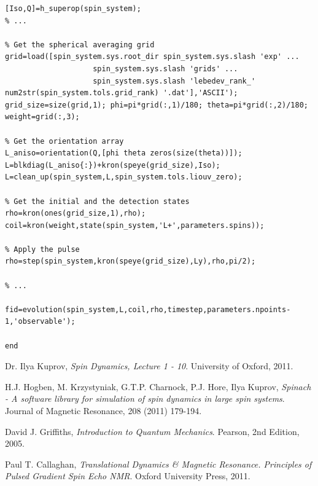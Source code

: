 \documentclass[11.5pt,a4paper]{article}
\begin{document}
\begin{lstlisting}[firstnumber=last]
% ...
[Iso,Q]=h_superop(spin_system);
% ...

% Get the spherical averaging grid
grid=load([spin_system.sys.root_dir spin_system.sys.slash 'exp' ...
				    spin_system.sys.slash 'grids' ...
				    spin_system.sys.slash 'lebedev_rank_' num2str(spin_system.tols.grid_rank) '.dat'],'ASCII');
grid_size=size(grid,1); phi=pi*grid(:,1)/180; theta=pi*grid(:,2)/180; weight=grid(:,3);

% Get the orientation array
L_aniso=orientation(Q,[phi theta zeros(size(theta))]);
L=blkdiag(L_aniso{:})+kron(speye(grid_size),Iso);
L=clean_up(spin_system,L,spin_system.tols.liouv_zero);

% Get the initial and the detection states
rho=kron(ones(grid_size,1),rho);
coil=kron(weight,state(spin_system,'L+',parameters.spins));

% Apply the pulse
rho=step(spin_system,kron(speye(grid_size),Ly),rho,pi/2);

% ...

fid=evolution(spin_system,L,coil,rho,timestep,parameters.npoints-1,'observable');

end
\end{lstlisting}



\FloatBarrier
\begin{thebibliography}{9}
  Dr. Ilya Kuprov,
  \emph{Spin Dynamics, Lecture 1 - 10}.
  University of Oxford,
  2011.

  H.J. Hogben, M. Krzystyniak, G.T.P. Charnock, P.J. Hore, Ilya Kuprov,
  \emph{Spinach - A software library for simulation of spin dynamics in large spin systems}.
  Journal of Magnetic Resonance,
  208 (2011) 179-194.

  David J. Griffiths,
  \emph{Introduction to Quantum Mechanics}.
  Pearson, 
  2nd Edition, 
  2005.

  Paul T. Callaghan,
  \emph{Translational Dynamics \& Magnetic Resonance. Principles of Pulsed Gradient Spin Echo NMR}.
  Oxford University Press,
  2011.

\end{thebibliography}
\end{document}
